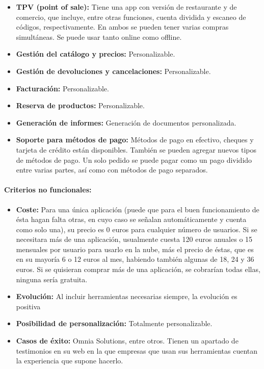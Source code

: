 \documentclass{article}
\begin{document}
\begin{itemize}

	\item \textbf{TPV (point of sale):} Tiene una app con versión de restaurante y de comercio, que incluye, entre otras funciones, cuenta dividida y escaneo de códigos, respectivamente. En ambos se pueden tener varias compras simultáneas. Se puede usar tanto online como offline. 
	\item \textbf{Gestión del catálogo y precios:} Personalizable.
	\item \textbf{Gestión de devoluciones y cancelaciones:} Personalizable.
	\item \textbf{Facturación:} Personalizable.
	\item \textbf{Reserva de productos:} Personalizable.
	\item \textbf{Generación de informes:} Generación de documentos personalizada.
	\item \textbf{Soporte para métodos de pago:} Métodos de pago en efectivo, cheques y tarjeta de crédito están disponibles. También se pueden agregar nuevos tipos de métodos de pago. Un solo pedido se puede pagar como un pago dividido entre varias partes, así como con métodos de pago separados.

\end{itemize}

\paragraph{Criterios no funcionales:}

\begin{itemize}

	\item \textbf{Coste:} Para una única aplicación (puede que para el buen funcionamiento de ésta hagan falta otras, en cuyo caso se señalan automáticamente y cuenta como solo una), su precio es 0 euros para cualquier número de usuarios. Si se necesitara más de una aplicación, usualmente cuesta 120 euros anuales o 15 mensuales por usuario para usarlo en la nube, más el precio de éstas, que es en su mayoría 6 o 12 euros al mes, habiendo también algunas de 18, 24 y 36 euros. Si se quisieran comprar más de una aplicación, se cobrarían todas ellas, ninguna sería gratuita.
	\item \textbf{Evolución:} Al incluir herramientas necesarias siempre, la evolución es positiva
	\item \textbf{Posibilidad de personalización:} Totalmente personalizable.
	\item \textbf{Casos de éxito:} Omnia Solutions, entre otros. Tienen un apartado de testimonios en su web en la que empresas que usan sus herramientas cuentan la experiencia que supone hacerlo.

\end{itemize}
\end{document}
